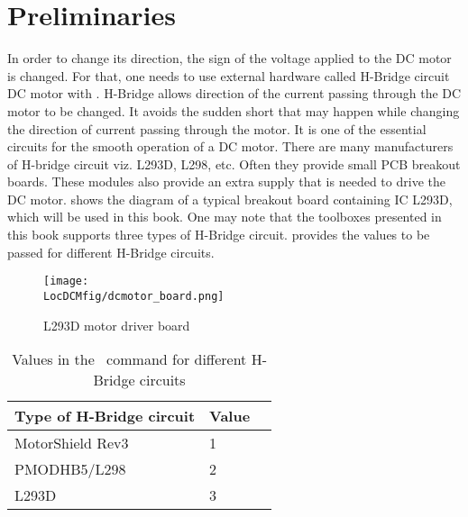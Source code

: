 \section{Preliminaries}
In order to change its direction, the sign of the voltage applied to
the DC motor is changed.  For that, one needs to use external hardware
called %
H-Bridge circuit DC motor with \arduino. %
H-Bridge allows direction of the current passing through the DC motor
to be changed. It avoids the sudden short that may happen while
changing the direction of current passing through the motor.  It is
one of the essential circuits for the smooth operation of a DC
motor. There are many manufacturers of H-bridge circuit viz.
%
L293D, L298, etc.  Often they provide small %
PCB breakout boards.  These modules also provide an extra supply that
is needed to drive the DC motor.   shows
the diagram of a typical breakout board containing IC L293D, which will
be used in this book. One may note that the toolboxes presented in this book supports three types of H-Bridge circuit.  provides the values to be passed for different H-Bridge circuits. \par

\begin{figure}
  \centering
  \texttt{[image: \\LocDCMfig/dcmotor\_board.png]}
  \caption{L293D motor driver board}
  \label{fig:motordriverboard}
\end{figure}

\begin{table}
  \centering
  \caption{Values in the \scilab\ command for different H-Bridge circuits}
  \label{table:convention}
  \begin{tabular}{llc}\hline
    Type of H-Bridge circuit & Value \\ \hline
    MotorShield Rev3         & 1                             \\ \hline 
    PMODHB5/L298             & 2                             \\ \hline 
    L293D                    & 3                             \\ \hline
  \end{tabular}
\end{table}

